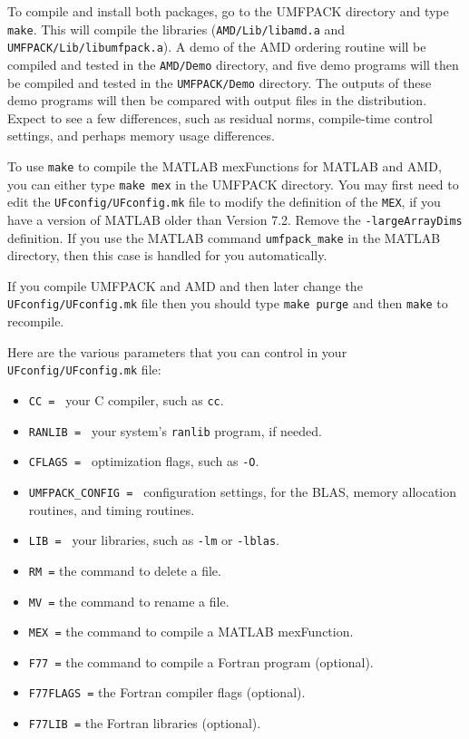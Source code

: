 \documentclass[11pt]{article}
\begin{document}
To compile and install both packages,
go to the UMFPACK directory and type {\tt make}.  This will compile the
libraries ({\tt AMD/Lib/libamd.a} and {\tt UMFPACK/Lib/libumfpack.a}).
A demo of the AMD ordering routine will be compiled and tested in
the {\tt AMD/Demo} directory, and five demo programs will then be
compiled and tested in the {\tt UMFPACK/Demo} directory.
The outputs of these demo programs will then be compared with output
files in the distribution.  Expect to see a few differences, such as
residual norms, compile-time control settings, and perhaps memory usage
differences.

To use {\tt make} to compile the MATLAB mexFunctions for MATLAB
and AMD, you can either type {\tt make mex} in the UMFPACK directory.
You may first need to edit the {\tt UFconfig/UFconfig.mk} file to
modify the definition of the {\tt MEX}, if you have a version of MATLAB
older than Version 7.2.  Remove the {\tt -largeArrayDims} definition.
If you use the MATLAB command {\tt umfpack\_make} in the MATLAB directory,
then this case is handled for you automatically.

If you compile UMFPACK and AMD and then later change the
{\tt UFconfig/UFconfig.mk} file
then you should type {\tt make purge} and then {\tt make} to recompile.

Here are the various parameters that you can control in your
{\tt UFconfig/UFconfig.mk} file:

\begin{itemize}
\item {\tt CC = } your C compiler, such as {\tt cc}.
\item {\tt RANLIB = } your system's {\tt ranlib} program, if needed.
\item {\tt CFLAGS = } optimization flags, such as {\tt -O}.
\item {\tt UMFPACK\_CONFIG = } configuration settings, for the BLAS,
    memory allocation routines, and timing routines.
\item {\tt LIB = } your libraries, such as {\tt -lm} or {\tt -lblas}.
\item {\tt RM =} the command to delete a file.
\item {\tt MV =} the command to rename a file.
\item {\tt MEX =} the command to compile a MATLAB mexFunction.
\item {\tt F77 =} the command to compile a Fortran program (optional).
\item {\tt F77FLAGS =} the Fortran compiler flags (optional).
\item {\tt F77LIB =} the Fortran libraries (optional).
\end{itemize}
\end{document}
